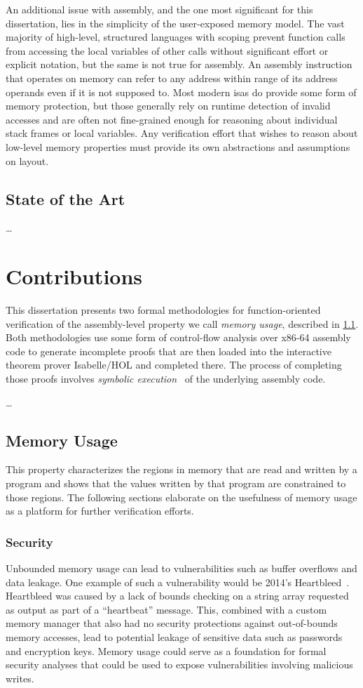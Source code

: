 An additional issue with assembly,
and the one most significant for this dissertation,
lies in the simplicity of the user-exposed memory model.
The vast majority of high-level, structured languages with scoping
prevent function calls from accessing the local variables of other calls
without significant effort or explicit notation, but the same is not true for assembly.
An assembly instruction that operates on memory can refer to any
address within range of its address operands even if it is not supposed to.
Most modern \acp{isa} do provide some form of memory protection,
but those generally rely on runtime detection of invalid accesses
and are often not fine-grained enough for reasoning about individual stack frames
or local variables.
Any verification effort that wishes to reason about low-level memory properties
must provide its own abstractions and assumptions on layout.

\subsection{State of the Art}
\todo\dots

\section{Contributions}
This dissertation presents two formal methodologies for function-oriented verification
of the assembly-level property we call \emph{memory usage},
described in \cref{memory_usage}.
Both methodologies use some form of control-flow analysis over x86-64 assembly code
to generate incomplete proofs
that are then loaded into the interactive theorem prover Isabelle/HOL
and completed there. The process of completing those proofs involves
\emph{symbolic execution}~\citep{king1976symbolic} of the underlying assembly code.

\todo\dots

\subsection{Memory Usage}\label{memory_usage}
This property characterizes the regions in memory that are read and written by a program
and shows that the values written by that program are constrained to those regions.
The following sections elaborate on the usefulness of memory usage
as a platform for further verification efforts.

\subsubsection{Security}
Unbounded memory usage can lead to vulnerabilities
such as buffer overflows and data leakage.
One example of such a vulnerability would be 2014's Heartbleed~\citep{heartbleed}.
Heartbleed was caused by a lack of bounds checking on a string array
requested as output as part of a ``heartbeat'' message.
This, combined with a custom memory manager
that also had no security protections against out-of-bounds memory accesses,
lead to potential leakage of sensitive data such as passwords and encryption keys.
Memory usage could serve as a foundation for formal security analyses
that could be used to expose vulnerabilities involving malicious writes.


